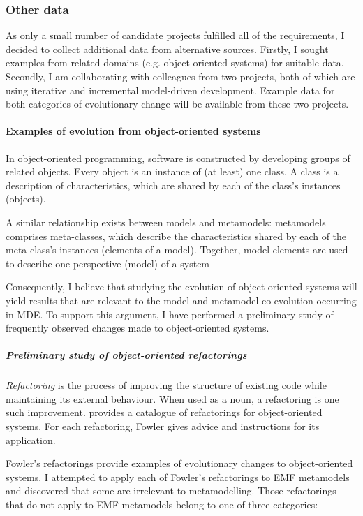 \subsubsection{Other data} %
\label{ssub:other_data}
As only a small number of candidate projects fulfilled all of the requirements, I decided to collect additional data from alternative sources. Firstly, I sought examples from related domains (e.g. object-oriented systems) for suitable data. Secondly, I am collaborating with colleagues from two projects, both of which are using iterative and incremental model-driven development. Example data for both categories of evolutionary change will be available from these two projects.

\paragraph{Examples of evolution from object-oriented systems} %
\label{par:examples_of_evolution_from_object_oriented_systems}
In object-oriented programming, software is constructed by developing groups of related objects. Every object is an instance of (at least) one class. A class is a description of characteristics, which are shared by each of the class's instances (objects).

A similar relationship exists between models and metamodels: metamodels comprises meta-classes, which describe the characteristics shared by each of the meta-class's instances (elements of a model). Together, model elements are used to describe one perspective (model) of a system

Consequently, I believe that studying the evolution of object-oriented systems will yield results that are relevant to the model and metamodel co-evolution occurring in MDE. To support this argument, I have performed a preliminary study of frequently observed changes made to object-oriented systems.

\subparagraph{Preliminary study of object-oriented refactorings} %
\label{subp:preliminary_study_of_object_oriented_refactorings}
\emph{Refactoring} is the process of improving the structure of existing code while maintaining its external behaviour. When used as a noun, a refactoring is one such improvement. \cite{fowler99refactoring} provides a catalogue of refactorings for object-oriented systems. For each refactoring, Fowler gives advice and instructions for its application.

Fowler's refactorings provide examples of evolutionary changes to object-oriented systems. I attempted to apply each of Fowler's refactorings to EMF metamodels and discovered that some are irrelevant to metamodelling. Those refactorings that do not apply to EMF metamodels belong to one of three categories:


